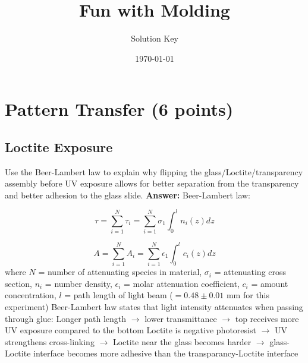 \documentclass[12pt]{article}%
\begin{document}
\title{Fun with Molding}
\author{Solution Key}
\date{\today}
\maketitle
\section{Pattern Transfer (6 points)}

\subsection{Loctite Exposure} Use the Beer-Lambert law to explain why flipping the glass/Loctite/transparency assembly before UV exposure allows for better separation from the transparency and better adhesion to the glass slide.
\newline
\newline
\textbf{Answer:}
\newline
\newline
Beer-Lambert law:
\newline

\begin{equation}
\tau = \sum_{i=1}^{N} \tau_{i} = \sum_{i=1}^{N} \sigma_1 \int_{0}^{l} n_i(z)dz
\end{equation}
\newline

\begin{equation}
A = \sum_{i=1}^{N} A_i = \sum_{i=1}^{N} \epsilon_1 \int_{0}^{l} c_i(z) dz
\end{equation}
\newline
\newline
where $N$ = number of attenuating species in material, $\sigma_i$ = attenuating cross section, $n_i$ = number density, $\epsilon_i$ = molar attenuation coefficient, $c_i$ = amount concentration, $l$ = path length of light beam ($=0.48 \pm 0.01$ mm for this experiment)
\newline
\newline
[1] Beer-Lambert law states that light intensity attenuates when passing through glue: \newline
Longer path length $\rightarrow$ lower transmittance $\rightarrow$ top receives more UV exposure compared to the bottom
\newline
\newline
[1] Loctite is negative photoresist $\rightarrow$ UV strengthens cross-linking $\rightarrow$ Loctite near the glass becomes harder $\rightarrow$ glass-Loctite interface becomes more adhesive than the transparancy-Loctite interface
\end{document}
